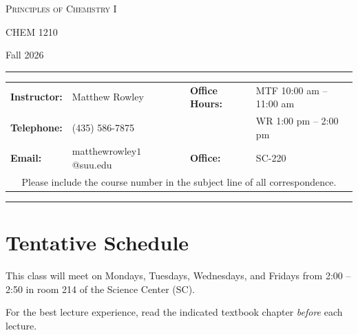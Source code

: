 \documentclass[12pt, letterpaper]{article}
\begin{document}
\begin{center}
	{\Large \textsc{Principles of Chemistry I}}

	CHEM 1210
\end{center}

\begin{center}
	{\large Fall 2026}
\end{center}
\begin{center}
	\rule{0.99\textwidth}{0.4pt}
	\begin{tabular}{llcll}
		\textbf{Instructor:} & Matthew Rowley           &  & \textbf{Office Hours:} & MTF 10:00 am -- 11:00 am \\
		\textbf{Telephone:}  & (435) 586-7875           &  &                        & WR 1:00 pm -- 2:00 pm    \\
		\textbf{Email:}      & matthewrowley$1$@suu.edu &  & \textbf{Office:}       & SC-220                   \\
		\multicolumn{5}{c}{Please include the course number in the subject line of all correspondence.}
	\end{tabular}
	\rule{0.99\textwidth}{0.4pt}
\end{center}

\section*{Tentative Schedule}
This class will meet on Mondays, Tuesdays, Wednesdays, and Fridays from 2:00 -- 2:50 in room 214 of the Science Center (SC).


\noindent For the best lecture experience, read the indicated textbook chapter \emph{before} each lecture.
\end{document}
